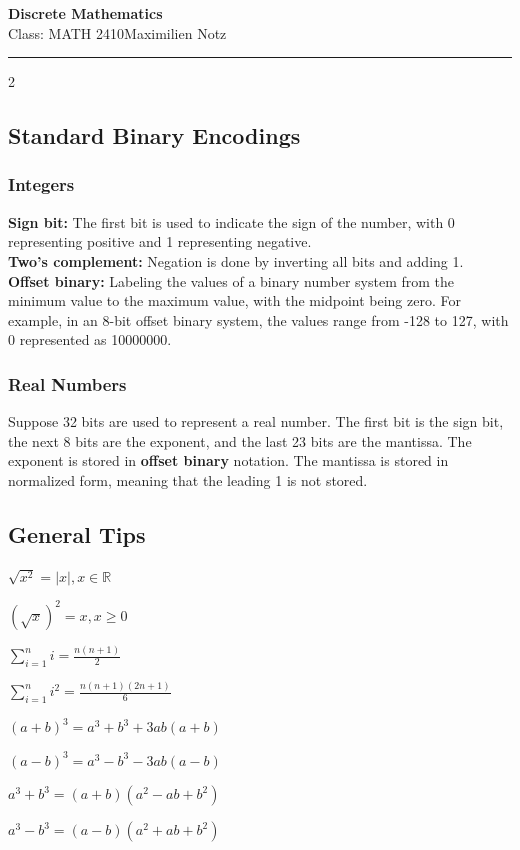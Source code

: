 \documentclass[5pt]{article}
\begin{document}
\newtheorem{theorem}{Theorem}
\newtheorem{lemma}{Lemma}
\newtheorem{properties}{Properties}
\newtheorem{axiom}{Axiom}


\begin{center}
     \Large{\textbf{Discrete Mathematics}}\\
     \small{Class: MATH 2410}\hfill\small{\textcopyright Maximilien Notz \the\year{}}
     \noindent\rule{20.2cm}{0.4pt}
\end{center}

\begin{multicols}{2}
\setcounter{secnumdepth}{0}

\subsection{Standard Binary Encodings}
\subsubsection{Integers}
\textbf{Sign bit:} The first bit is used to indicate the sign of the number, with 0 representing positive and 1 representing negative.\\
\textbf{Two's complement:} Negation is done by inverting all bits and adding 1.\\
\textbf{Offset binary:} Labeling the values of a binary number system from the minimum value to the maximum value, with the midpoint being zero. For example, in an 8-bit offset binary system, the values range from -128 to 127, with 0 represented as 10000000.\\


\subsubsection{Real Numbers}
Suppose 32 bits are used to represent a real number.
The first bit is the sign bit, the next 8 bits are the exponent, and the last 23 bits are the mantissa. 
The exponent is stored in \textbf{offset binary} notation. The mantissa is stored in normalized form, meaning that the leading 1 is not stored.

\end{multicols}
\subsection{General Tips}
\begin{itemize*}
    \item $\sqrt{x^2}=|x|,x\in\mathbb{R}$
    \item $(\sqrt{x})^2=x, x\geq 0$
    \item $\sum_{i=1}^{n}i=\frac{n(n+1)}{2}$
    \item $\sum_{i=1}^{n}i^2=\frac{n(n+1)(2n+1)}{6}$\\
    \item $(a+b)^3=a^3+b^3+3ab(a+b)$
    \item $(a-b)^3=a^3-b^3-3ab(a-b)$
    \item $a^3+b^3=(a+b)(a^2-ab+b^2)$
    \item $a^3-b^3=(a-b)(a^2+ab+b^2)$
\end{itemize*}
\end{document}
